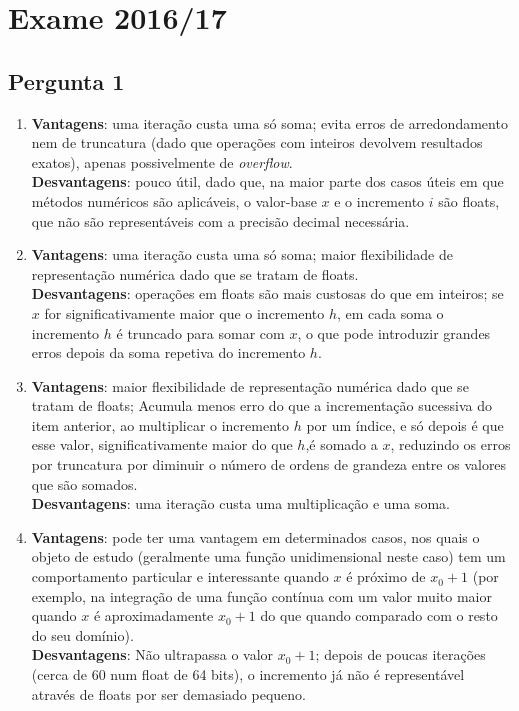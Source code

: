 \setcounter{chapter}{15}
\chapter{Exame 2016/17}
{
\renewcommand{\thesubsection}{\thesection\alph{subsection}}

\section{Pergunta 1}
\begin{enumerate}
    \item
    \textbf{Vantagens}: uma iteração custa uma só soma; evita erros de arredondamento nem de truncatura (dado que operações com inteiros devolvem resultados exatos), apenas possivelmente de \textit{overflow}.\\
    \textbf{Desvantagens}: pouco útil, dado que, na maior parte dos casos úteis em que métodos numéricos são aplicáveis, o valor-base $x$ e o incremento $i$ são floats, que não são representáveis com a precisão decimal necessária.
    \item 
    \textbf{Vantagens}: uma iteração custa uma só soma; maior flexibilidade de representação numérica dado que se tratam de floats.\\
    \textbf{Desvantagens}: operações em floats são mais custosas do que em inteiros; se $x$ for significativamente maior que o incremento $h$, em cada soma o incremento $h$ é truncado para somar com $x$, o que pode introduzir grandes erros depois da soma repetiva do incremento $h$.
    \item
    \textbf{Vantagens}: maior flexibilidade de representação numérica dado que se tratam de floats; Acumula menos erro do que a incrementação sucessiva do item anterior, ao multiplicar o incremento $h$ por um índice, e só depois é que esse valor, significativamente maior do que $h$,é somado a $x$, reduzindo os erros por truncatura por diminuir o número de ordens de grandeza entre os valores que são somados.\\
    \textbf{Desvantagens}: uma iteração custa uma multiplicação e uma soma.
    \item
    \textbf{Vantagens}: pode ter uma vantagem em determinados casos, nos quais o objeto de estudo (geralmente uma função unidimensional neste caso) tem um comportamento particular e interessante quando $x$ é próximo de $x_0+1$ (por exemplo, na integração de uma função contínua com um valor muito maior quando $x$ é aproximadamente $x_0+1$ do que quando comparado com o resto do seu domínio).\\
    \textbf{Desvantagens}: Não ultrapassa o valor $x_0+1$; depois de poucas iterações (cerca de 60 num float de 64 bits), o incremento já não é representável através de floats por ser demasiado pequeno.
\end{enumerate}

}
